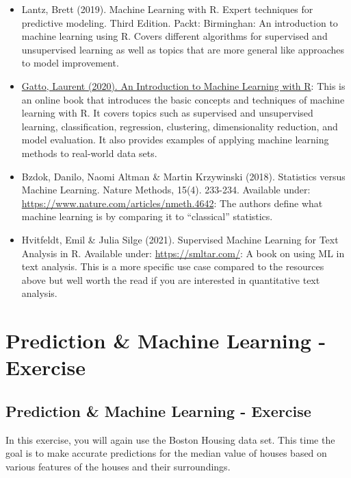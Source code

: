 \documentclass[
]{book}
\begin{document}
\begin{itemize}
\item
  Lantz, Brett (2019). Machine Learning with R. Expert techniques for predictive modeling. Third Edition. Packt: Birminghan: An introduction to machine learning using R. Covers different algorithms for supervised and unsupervised learning as well as topics that are more general like approaches to model improvement.
\item
  \href{https://lgatto.github.io/IntroMachineLearningWithR/}{Gatto, Laurent (2020). An Introduction to Machine Learning with R}: This is an online book that introduces the basic concepts and techniques of machine learning with R. It covers topics such as supervised and unsupervised learning, classification, regression, clustering, dimensionality reduction, and model evaluation. It also provides examples of applying machine learning methods to real-world data sets.
\item
  Bzdok, Danilo, Naomi Altman \& Martin Krzywinski (2018). Statistics versus Machine Learning. Nature Methods, 15(4). 233-234. Available under: \url{https://www.nature.com/articles/nmeth.4642}: The authors define what machine learning is by comparing it to ``classical'' statistics.
\item
  Hvitfeldt, Emil \& Julia Silge (2021). Supervised Machine Learning for Text Analysis in R. Available under: \url{https://smltar.com/}: A book on using ML in text analysis. This is a more specific use case compared to the resources above but well worth the read if you are interested in quantitative text analysis.
\end{itemize}

\hypertarget{pm-a}{%
\chapter{Prediction \& Machine Learning - Exercise}\label{pm-a}}

\hypertarget{prediction-machine-learning---exercise}{%
\section{Prediction \& Machine Learning - Exercise}\label{prediction-machine-learning---exercise}}

In this exercise, you will again use the Boston Housing data set. This
time the goal is to make accurate predictions for the median value of
houses based on various features of the houses and their surroundings.
\end{document}
